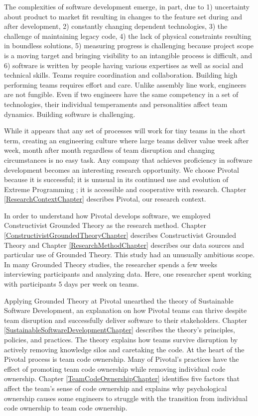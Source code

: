 The complexities of software development emerge, in part, due to 1) uncertainty about product to market fit resulting in changes to the feature set during and after development, 2) constantly changing dependent technologies, 3) the challenge of maintaining legacy code, 4) the lack of physical constraints resulting in boundless solutions, 5) measuring progress is challenging because project scope is a moving target and bringing visibility to an intangible process is difficult, and 6) software is written by people having various expertises as well as social and technical skills. Teams require coordination and collaboration. Building high performing teams requires effort and care. Unlike assembly line work, engineers are not fungible. Even if two engineers have the same competency in a set of technologies, their individual temperaments and personalities affect team dynamics. Building software is challenging. 

While it appears that any set of processes will work for tiny teams in the short term, creating an engineering culture where large teams deliver value week after week, month after month regardless of team disruption and changing circumstances is no easy task. Any company that achieves proficiency in software development becomes an interesting research opportunity. We choose Pivotal because it is successful; it is unusual in its continued use and evolution of Extreme Programming \cite{BeckExtremeProgramming2004};  it is accessible and cooperative with research. Chapter \ref{ResearchContextChapter} describes Pivotal, our research context. 

In order to understand how Pivotal develops software, we employed Constructivist Grounded Theory as the research method. Chapter \ref{ConstructivistGroundedTheoryChapter} describes Constructivist Grounded Theory and Chapter \ref{ResearchMethodChapter} describes our data sources and particular use of Grounded Theory. This study had an unusually ambitious scope. In many Grounded Theory studies, the researcher spends a few weeks interviewing participants and analyzing data. Here, one researcher spent \durationOfResearchStudyPlural{} working with participants 5 days per week on \numberOfObservedProjects{} teams. 

Applying Grounded Theory at Pivotal unearthed the theory of Sustainable Software Development, an explanation on how Pivotal teams can thrive despite team disruption and successfully deliver software to their stakeholders. Chapter \ref{SustainableSoftwareDevelopmentChapter} describes the theory's principles, policies, and practices. The theory explains how teams survive disruption by actively removing knowledge silos and caretaking the code. At the heart of the Pivotal process is team code ownership. Many of Pivotal's practices have the effect of promoting team code ownership while removing individual code ownership. Chapter \ref{TeamCodeOwnershipChapter} identifies five factors that affect the team's sense of code ownership and explains why psychological ownership causes some engineers to struggle with the transition from individual code ownership to team code ownership. 

